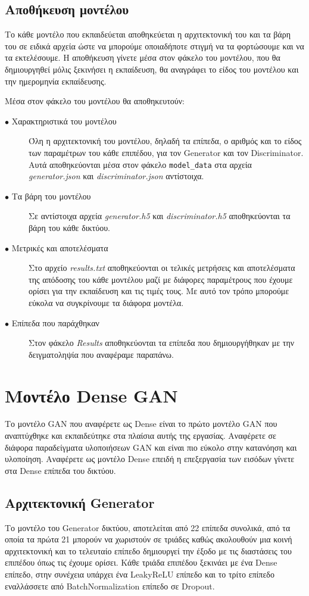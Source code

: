 \subsection{Αποθήκευση μοντέλου}
Το κάθε μοντέλο που εκπαιδεύεται αποθηκεύεται η αρχιτεκτονική του και τα βάρη του σε ειδικά αρχεία ώστε να μπορούμε οποιαδήποτε στιγμή να τα φορτώσουμε και να τα εκτελέσουμε. Η αποθήκευση γίνετε μέσα στον φάκελο του μοντέλου, που θα δημιουργηθεί μόλις ξεκινήσει η εκπαίδευση, θα αναγράφει το είδος του μοντέλου και την ημερομηνία εκπαίδευσης.
\par
Μέσα στον φάκελο του μοντέλου θα αποθηκευτούν:
\begin{description}
\item[$\bullet$ Χαρακτηριστικά του μοντέλου] Όλη η αρχιτεκτονική του μοντέλου, δηλαδή τα επίπεδα, ο αριθμός και το είδος των παραμέτρων του κάθε επιπέδου, για τον Generator και τον Discriminator. Αυτά αποθηκεύονται μέσα στον φάκελο \texttt{model\_data} στα αρχεία  \textit{generator.json} και \textit{discriminator.json} αντίστοιχα.
\item[$\bullet$ Τα βάρη του μοντέλου] Σε αντίστοιχα αρχεία \textit{generator.h5} και \textit{discriminator.h5} αποθηκεύονται τα βάρη του κάθε δικτύου.
\item[$\bullet$ Μετρικές και αποτελέσματα] Στο αρχείο \textit{results.txt} αποθηκεύονται οι τελικές μετρήσεις και αποτελέσματα της απόδοσης του κάθε μοντέλου μαζί με διάφορες παραμέτρους που έχουμε ορίσει για την εκπαίδευση και τις τιμές τους. Με αυτό τον τρόπο μπορούμε εύκολα να συγκρίνουμε τα διάφορα μοντέλα.
\item[$\bullet$ Επίπεδα που παράχθηκαν] Στον φάκελο \textit{Results} αποθηκεύονται τα επίπεδα που δημιουργήθηκαν με την δειγματοληψία που αναφέραμε παραπάνω.
\end{description}

\section{Μοντέλο Dense GAN}

Το μοντέλο GAN που αναφέρετε ως Dense είναι το πρώτο μοντέλο GAN που αναπτύχθηκε και εκπαιδεύτηκε στα πλαίσια αυτής της εργασίας. Αναφέρετε σε διάφορα παραδείγματα υλοποιήσεων GAN \cite{firstgan3} \cite{firstgan} \cite{firstgan2} και είναι πιο εύκολο στην κατανόηση και υλοποίηση. Αναφέρετε ως μοντέλο Dense επειδή η επεξεργασία των εισόδων γίνετε στα Dense επίπεδα του δικτύου.

\subsection{Αρχιτεκτονική Generator}
Το μοντέλο του Generator δικτύου, αποτελείται από 22 επίπεδα συνολικά, από τα οποία τα πρώτα 21 μπορούν να χωριστούν σε τριάδες καθώς ακολουθούν μια κοινή αρχιτεκτονική και το τελευταίο επίπεδο δημιουργεί την έξοδο με τις διαστάσεις του επιπέδου όπως τις έχουμε ορίσει. Κάθε τριάδα επιπέδου ξεκινάει με ένα Dense επίπεδο, στην συνέχεια υπάρχει ένα LeakyReLU επίπεδο \cite{leakyrelu} και το τρίτο επίπεδο εναλλάσσετε από BatchNormalization επίπεδο σε Dropout. 

